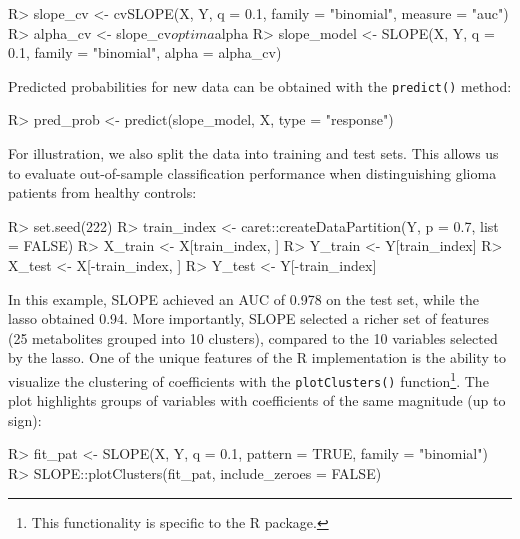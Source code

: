 \documentclass[article]{jss}
\begin{document}
\begin{Code}
R> slope_cv <- cvSLOPE(X, Y, q = 0.1, family = "binomial", measure = "auc")
R> alpha_cv <- slope_cv$optima$alpha
R> slope_model <- SLOPE(X, Y, q = 0.1, family = "binomial", alpha = alpha_cv)
\end{Code}

Predicted probabilities for new data can be obtained with the \texttt{predict()}
method:

\begin{Code}
R> pred_prob <- predict(slope_model, X, type = "response")
\end{Code}

For illustration, we also split the data into training and test sets. This
allows us to evaluate out-of-sample classification performance when
distinguishing glioma patients from healthy controls:

\begin{Code}
R> set.seed(222)
R> train_index <- caret::createDataPartition(Y, p = 0.7, list = FALSE)
R> X_train <- X[train_index, ]
R> Y_train <- Y[train_index]
R> X_test  <- X[-train_index, ]
R> Y_test  <- Y[-train_index]
\end{Code}

In this example, SLOPE achieved an AUC of 0.978 on the test set, while the
lasso obtained 0.94. More importantly, SLOPE selected a richer set of features
(25 metabolites grouped into 10 clusters), compared to the 10 variables
selected by the lasso. One of the unique features of the R implementation is
the ability to visualize the clustering of coefficients with the
\texttt{plotClusters()} function\footnote{This functionality is specific to the
  R package.}. The plot highlights groups of variables with coefficients of the
same magnitude (up to sign):

\begin{Code}
R> fit_pat <- SLOPE(X, Y, q = 0.1, pattern = TRUE, family = "binomial")
R> SLOPE::plotClusters(fit_pat, include_zeroes = FALSE)
\end{Code}
\end{document}
